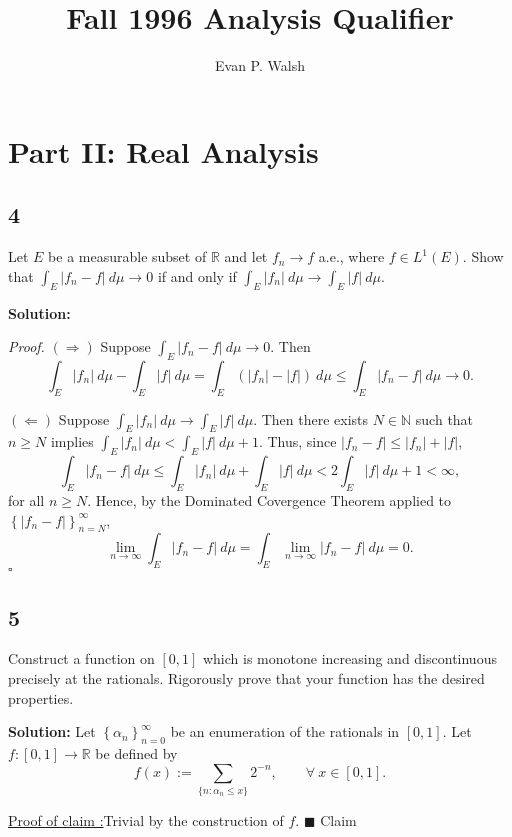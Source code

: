 \documentclass[12pt]{article}
\title{Fall 1996 Analysis Qualifier}
\author{Evan P. Walsh}
\newcounter{ProofCounter}
\newcounter{ClaimCounter}[ProofCounter]
\newenvironment{Proof}{\stepcounter{ProofCounter}\textit{Proof.}}{\hfill$\square$}
\newenvironment{claim}[1]{\vspace{3mm}\stepcounter{ClaimCounter}\par\noindent\underline{\bf Claim \theClaimCounter:}\space#1}{}
\newenvironment{claimproof}[1]{\par\noindent\underline{Proof of claim \theClaimCounter:}\space#1}{\hfill $\blacksquare$ Claim \theClaimCounter}
\begin{document}

\section*{Part II: Real Analysis}

\subsection*{4}
Let $E$ be a measurable subset of $\mathbb{R}$ and let $f_{n} \rightarrow f$ a.e., where $f \in L^{1}(E)$. Show that $\int_{E}|f_{n} - f|\ d\mu
\rightarrow 0$ if and only if $\int_{E}|f_{n}|\ d\mu \rightarrow \int_{E}|f|\ d\mu$.

{\bf Solution:}

\begin{Proof}
$(\Rightarrow)$ Suppose $\int_{E}|f_{n} - f|\ d\mu \rightarrow 0$. Then 
\[ \int_{E}|f_{n}|\ d\mu - \int_{E}|f|\ d\mu = \int_{E}(|f_{n}| - |f|)\ d\mu \leq \int_{E}|f_{n} - f| \ d\mu \rightarrow 0. \]

$(\Leftarrow)$ Suppose $\int_{E}|f_{n}|\ d\mu \rightarrow \int_{E}|f|\ d\mu$. Then there exists $N \in \mathbb{N}$ such that $n \geq N$ implies
$\int_{E}|f_{n}|\ d\mu < \int_{E}|f|\ d\mu + 1$.
Thus, since $|f_{n} - f| \leq |f_{n}| + |f|$,
\[ \int_{E}|f_{n} - f| \ d\mu \leq \int_{E}|f_{n}|\ d\mu + \int_{E}|f|\ d\mu < 2\int_{E}|f|\ d\mu + 1 < \infty, \]
for all $n \geq N$. Hence, by the Dominated Covergence Theorem applied to $\left\{ |f_{n} - f| \right\}_{n=N}^{\infty}$,
\[ \lim_{n\rightarrow\infty}\int_{E}|f_{n} - f| \ d\mu = \int_{E}\lim_{n\rightarrow\infty}|f_{n} - f|\ d\mu = 0. \]
\end{Proof}


\subsection*{5}
Construct a function on $[0,1]$ which is monotone increasing and discontinuous precisely at the rationals. Rigorously prove that your function has the
desired properties.

{\bf Solution:}
Let $\left\{ \alpha_{n} \right\}_{n=0}^{\infty}$ be an enumeration of the rationals in $[0,1]$. Let $f : [0,1] \rightarrow \mathbb{R}$ be defined by 
\[ f(x) := \sum_{\{n : \alpha_{n} \leq x \}}2^{-n}, \qquad \forall \ x \in [0,1]. \]
\begin{claimproof}
Trivial by the construction of $f$.
\end{claimproof}
\end{document}
